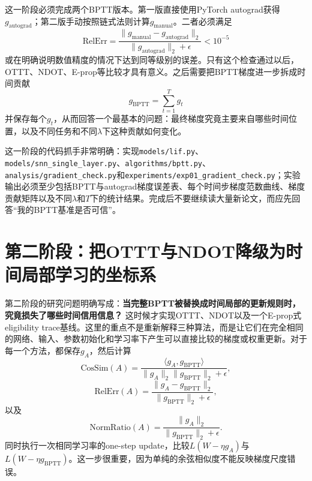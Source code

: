 \documentclass[journal,12pt,onecolumn]{IEEEtran}
\begin{document}
这一阶段必须完成两个BPTT版本。第一版直接使用PyTorch autograd获得$g_{\mathrm{autograd}}$；第二版手动按照链式法则计算$g_{\mathrm{manual}}$。二者必须满足
\begin{equation}
\mathrm{RelErr}
=
\frac{\|g_{\mathrm{manual}}-g_{\mathrm{autograd}}\|_2}
{\|g_{\mathrm{autograd}}\|_2+\epsilon}
<10^{-5}
\end{equation}
或在明确说明数值精度的情况下达到同等级别的误差。只有这个检查通过以后，OTTT、NDOT、E-prop等比较才具有意义。之后需要把BPTT梯度进一步拆成时间贡献
\begin{equation}
g_{\mathrm{BPTT}}=\sum_{t=1}^{T}g_t
\end{equation}
并保存每个$g_t$，从而回答一个最基本的问题：最终梯度究竟主要来自哪些时间位置，以及不同任务和不同$\lambda$下这种贡献如何变化。

这一阶段的代码抓手非常明确：实现\verb|models/lif.py|、\verb|models/snn_single_layer.py|、\verb|algorithms/bptt.py|、\verb|analysis/gradient_check.py|和\verb|experiments/exp01_gradient_check.py|；实验输出必须至少包括BPTT与autograd梯度误差表、每个时间步梯度范数曲线、梯度贡献矩阵以及不同$\lambda$和$T$下的统计结果。完成后不要继续读大量新论文，而应先回答“我的BPTT基准是否可信”。

\section{第二阶段：把OTTT与NDOT降级为时间局部学习的坐标系}

第二阶段的研究问题明确写成：\textbf{当完整BPTT被替换成时间局部的更新规则时，究竟损失了哪些时间信用信息？} 这时候才实现OTTT、NDOT以及一个E-prop式eligibility trace基线。这里的重点不是重新解释三种算法，而是让它们在完全相同的网络、输入、参数初始化和学习率下产生可以直接比较的梯度或权重更新。对于每一个方法，都保存$g_A$，然后计算
\begin{equation}
\mathrm{CosSim}(A)
=
\frac{\langle g_A,g_{\mathrm{BPTT}}\rangle}
{\|g_A\|_2\|g_{\mathrm{BPTT}}\|_2+\epsilon},
\end{equation}
\begin{equation}
\mathrm{RelErr}(A)
=
\frac{\|g_A-g_{\mathrm{BPTT}}\|_2}
{\|g_{\mathrm{BPTT}}\|_2+\epsilon},
\end{equation}
以及
\begin{equation}
\mathrm{NormRatio}(A)
=
\frac{\|g_A\|_2}
{\|g_{\mathrm{BPTT}}\|_2+\epsilon}.
\end{equation}
同时执行一次相同学习率的one-step update，比较$L(W-\eta g_A)$与$L(W-\eta g_{\mathrm{BPTT}})$。这一步很重要，因为单纯的余弦相似度不能反映梯度尺度错误。
\end{document}
